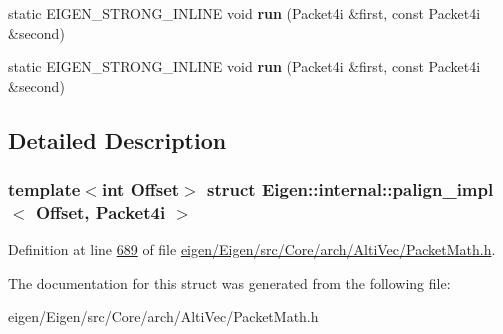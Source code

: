 \begin{DoxyCompactItemize}
static E\+I\+G\+E\+N\+\_\+\+S\+T\+R\+O\+N\+G\+\_\+\+I\+N\+L\+I\+NE void {\bfseries run} (Packet4i \&first, const Packet4i \&second)
\item 
\mbox{\label{struct_eigen_1_1internal_1_1palign__impl_3_01_offset_00_01_packet4i_01_4_a85d58b7eca3be350b89edc175e048335}} 
static E\+I\+G\+E\+N\+\_\+\+S\+T\+R\+O\+N\+G\+\_\+\+I\+N\+L\+I\+NE void {\bfseries run} (Packet4i \&first, const Packet4i \&second)
\end{DoxyCompactItemize}


\subsection{Detailed Description}
\subsubsection*{template$<$int Offset$>$\newline
struct Eigen\+::internal\+::palign\+\_\+impl$<$ Offset, Packet4i $>$}



Definition at line \hyperlink{eigen_2_eigen_2src_2_core_2arch_2_alti_vec_2_packet_math_8h_source_l00689}{689} of file \hyperlink{eigen_2_eigen_2src_2_core_2arch_2_alti_vec_2_packet_math_8h_source}{eigen/\+Eigen/src/\+Core/arch/\+Alti\+Vec/\+Packet\+Math.\+h}.



The documentation for this struct was generated from the following file\+:\begin{DoxyCompactItemize}
\item 
eigen/\+Eigen/src/\+Core/arch/\+Alti\+Vec/\+Packet\+Math.\+h\end{DoxyCompactItemize}
